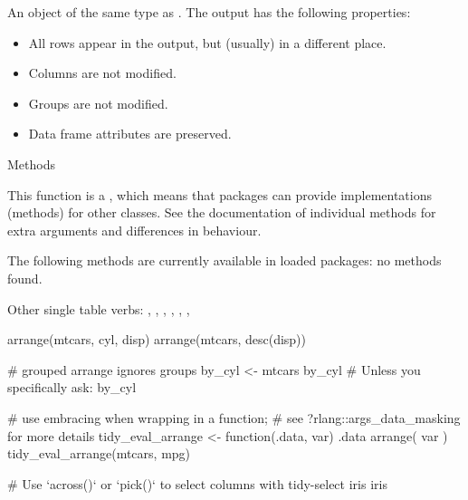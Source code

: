 \documentclass[a4paper]{book}
\begin{document}
%
\begin{Value}
An object of the same type as . The output has the following
properties:
\begin{itemize}

\item{} All rows appear in the output, but (usually) in a different place.
\item{} Columns are not modified.
\item{} Groups are not modified.
\item{} Data frame attributes are preserved.

\end{itemize}

\end{Value}
%
\begin{Section}{Methods}

This function is a , which means that packages can provide
implementations (methods) for other classes. See the documentation of
individual methods for extra arguments and differences in behaviour.

The following methods are currently available in loaded packages:
no methods found.
\end{Section}
%
\begin{SeeAlso}
Other single table verbs: 
,
,
,
,
,
,
\end{SeeAlso}
%
\begin{Examples}
\begin{ExampleCode}
arrange(mtcars, cyl, disp)
arrange(mtcars, desc(disp))

# grouped arrange ignores groups
by_cyl <- mtcars %
by_cyl %
# Unless you specifically ask:
by_cyl %

# use embracing when wrapping in a function;
# see ?rlang::args_data_masking for more details
tidy_eval_arrange <- function(.data, var) {
  .data %
    arrange({{ var }})
}
tidy_eval_arrange(mtcars, mpg)

# Use `across()` or `pick()` to select columns with tidy-select
iris %
iris %
\end{ExampleCode}
\end{Examples}
\end{document}

